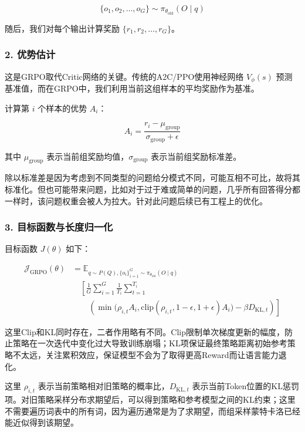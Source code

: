\[
\{o_1,o_2,\ldots,o_G\}\sim \pi_{\theta_{\mathrm{old}}}(O\mid q)
\]

随后，我们对每个输出计算奖励 \(\{r_1,r_2,\ldots,r_G\}\)。

\hypertarget{ux4f18ux52bfux4f30ux8ba1}{%
\subsubsection{2. 优势估计}\label{ux4f18ux52bfux4f30ux8ba1}}

这是GRPO取代Critic网络的关键。传统的A2C/PPO使用神经网络 \(V_{\phi}(s)\) 预测基准值，而在GRPO中，我们利用当前这组样本的平均奖励作为基准。

计算第 \(i\) 个样本的优势 \(A_i\)：

\[
A_i=\frac{r_i-\mu_{\mathrm{group}}}{\sigma_{\mathrm{group}}+\epsilon}
\]

其中 \(\mu_{\mathrm{group}}\) 表示当前组奖励均值，\(\sigma_{\mathrm{group}}\) 表示当前组奖励标准差。

除以标准差是因为考虑到不同类型的问题给分模式不同，可能互相不可比，故将其标准化。但也可能带来问题，比如对于过于难或简单的问题，几乎所有回答得分都一样时，该问题权重会被人为拉大。针对此问题后续已有工程上的优化。

\hypertarget{ux76eeux6807ux51fdux6570ux4e0eux957fux5ea6ux5f52ux4e00ux5316}{%
\subsubsection{3. 目标函数与长度归一化}\label{ux76eeux6807ux51fdux6570ux4e0eux957fux5ea6ux5f52ux4e00ux5316}}

目标函数 \(J(\theta)\) 如下：

\[
\begin{aligned}
\mathcal{J}_{\mathrm{GRPO}}(\theta)
&=\mathbb{E}_{q\sim P(Q),\{o_i\}_{i=1}^{G}\sim\pi_{\theta_{\mathrm{old}}}(O\mid q)} \\
&\quad \left[
\frac{1}{G}\sum_{i=1}^{G}\frac{1}{T_i}\sum_{t=1}^{T_i}
\right. \\
&\qquad \left.
\left(
\min\!\bigl(\rho_{i,t}A_i,\mathrm{clip}(\rho_{i,t},1-\epsilon,1+\epsilon)A_i\bigr)
-\beta D_{\mathrm{KL},t}
\right)
\right]
\end{aligned}
\]

这里Clip和KL同时存在，二者作用略有不同。Clip限制单次梯度更新的幅度，防止策略在一次迭代中变化过大导致训练崩塌；KL项保证最终策略距离初始参考策略不太远，关注累积效应，保证模型不会为了取得更高Reward而让语言能力退化。

这里 \(\rho_{i,t}\) 表示当前策略相对旧策略的概率比，\(D_{\mathrm{KL},t}\) 表示当前Token位置的KL惩罚项。对旧策略采样分布求期望后，可以得到策略和参考模型之间的KL约束；这里不需要遍历词表中的所有词，因为遍历通常是为了求期望，而组采样蒙特卡洛已经能近似得到该期望。

